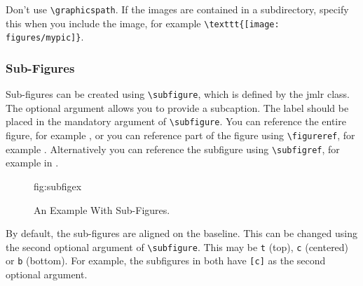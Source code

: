 \documentclass[pmlr]{jmlr}%
\begin{document}
Don't use \verb|\graphicspath|. If the images are contained in
a subdirectory, specify this when you include the image, for
example \verb|\texttt{[image: figures/mypic]}|.

\subsubsection{Sub-Figures}
\label{sec:subfigures}

Sub-figures can be created using \verb|\subfigure|, which is
defined by the \textsf{jmlr} class. The optional argument allows
you to provide a subcaption. The label should be placed in the
mandatory argument of \verb|\subfigure|. You can reference the
entire figure, for example , or you can
reference part of the figure using \verb|\figureref|, for example
. Alternatively you can reference the
subfigure using \verb|\subfigref|, for example
 in .

\begin{figure}[htbp]
\floatconts
  {fig:subfigex}
  {\caption{An Example With Sub-Figures.}}
  {%
    \qquad
  }
\end{figure}

By default, the sub-figures are aligned on the baseline.
This can be changed using the second optional argument
of \verb|\subfigure|. This may be \texttt{t} (top), \texttt{c}
(centered) or \texttt{b} (bottom). For example, the subfigures
 in 
both have \verb|[c]| as the second optional argument.
\end{document}
